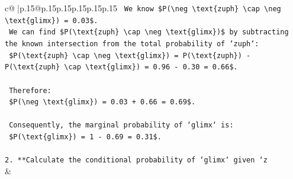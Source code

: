 \documentclass{article}
\begin{document}
{\begin{supertabular}{c@{$\;$}|p{.15\linewidth}@{}p{.15\linewidth}p{.15\linewidth}p{.15\linewidth}p{.15\linewidth}p{.15\linewidth}}
{{{\texttt{    We know \$P(\textbackslash{}neg \textbackslash{}text\{zuph\} \textbackslash{}cap \textbackslash{}neg \textbackslash{}text\{glimx\}) = 0.03\$.} \\
\texttt{    We can find \$P(\textbackslash{}text\{zuph\} \textbackslash{}cap \textbackslash{}neg \textbackslash{}text\{glimx\})\$ by subtracting the known intersection from the total probability of `zuph`:} \\
\texttt{    \$P(\textbackslash{}text\{zuph\} \textbackslash{}cap \textbackslash{}neg \textbackslash{}text\{glimx\}) = P(\textbackslash{}text\{zuph\}) {-} P(\textbackslash{}text\{zuph\} \textbackslash{}cap \textbackslash{}text\{glimx\}) = 0.96 {-} 0.30 = 0.66\$.} \\
\\ 
\texttt{    Therefore:} \\
\texttt{    \$P(\textbackslash{}neg \textbackslash{}text\{glimx\}) = 0.03 + 0.66 = 0.69\$.} \\
\\ 
\texttt{    Consequently, the marginal probability of `glimx` is:} \\
\texttt{    \$P(\textbackslash{}text\{glimx\}) = 1 {-} 0.69 = 0.31\$.} \\
\\ 
\texttt{2.  **Calculate the conditional probability of `glimx` given `z} \\
            }
        }
    }
    & \\ \\


\end{supertabular}}
\end{document}
